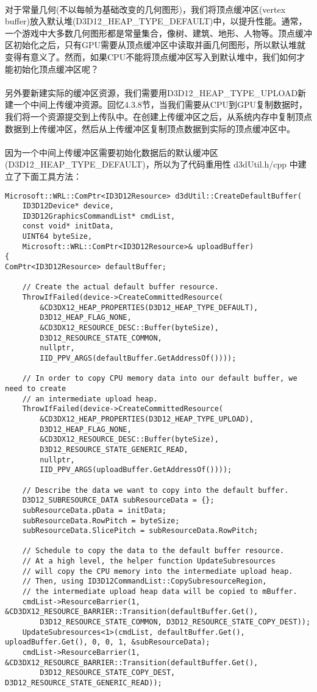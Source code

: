 \begin{flushleft}
~\\
对于常量几何(不以每帧为基础改变的几何图形)，我们将顶点缓冲区(vertex buffer)放入默认堆(D3D12\_HEAP\_TYPE\_DEFAULT)中，以提升性能。通常，一个游戏中大多数几何图形都是常量集合，像树、建筑、地形、人物等。顶点缓冲区初始化之后，只有GPU需要从顶点缓冲区中读取并画几何图形，所以默认堆就变得有意义了。然而，如果CPU不能将顶点缓冲区写入到默认堆中，我们如何才能初始化顶点缓冲区呢？\\
~\\
另外要新建实际的缓冲区资源，我们需要用D3D12\_HEAP\_TYPE\_UPLOAD新建一个中间上传缓冲资源。回忆4.3.8节，当我们需要从CPU到GPU复制数据时，我们将一个资源提交到上传队中。在创建上传缓冲区之后，从系统内存中复制顶点数据到上传缓冲区，然后从上传缓冲区复制顶点数据到实际的顶点缓冲区中。\\
~\\
因为一个中间上传缓冲区需要初始化数据后的默认缓冲区(D3D12\_HEAP\_TYPE\_DEFAULT)，所以为了代码重用性 d3dUtil.h/cpp 中建立了下面工具方法：
\begin{lstlisting}
Microsoft::WRL::ComPtr<ID3D12Resource> d3dUtil::CreateDefaultBuffer(
    ID3D12Device* device,
    ID3D12GraphicsCommandList* cmdList,
    const void* initData,
    UINT64 byteSize,
    Microsoft::WRL::ComPtr<ID3D12Resource>& uploadBuffer)
{
ComPtr<ID3D12Resource> defaultBuffer;

    // Create the actual default buffer resource.
    ThrowIfFailed(device->CreateCommittedResource(
        &CD3DX12_HEAP_PROPERTIES(D3D12_HEAP_TYPE_DEFAULT),
        D3D12_HEAP_FLAG_NONE,
        &CD3DX12_RESOURCE_DESC::Buffer(byteSize),
        D3D12_RESOURCE_STATE_COMMON,
        nullptr,
        IID_PPV_ARGS(defaultBuffer.GetAddressOf())));

    // In order to copy CPU memory data into our default buffer, we need to create
    // an intermediate upload heap. 
    ThrowIfFailed(device->CreateCommittedResource(
        &CD3DX12_HEAP_PROPERTIES(D3D12_HEAP_TYPE_UPLOAD),
        D3D12_HEAP_FLAG_NONE,
        &CD3DX12_RESOURCE_DESC::Buffer(byteSize),
        D3D12_RESOURCE_STATE_GENERIC_READ,
        nullptr,
        IID_PPV_ARGS(uploadBuffer.GetAddressOf())));

    // Describe the data we want to copy into the default buffer.
    D3D12_SUBRESOURCE_DATA subResourceData = {};
    subResourceData.pData = initData;
    subResourceData.RowPitch = byteSize;
    subResourceData.SlicePitch = subResourceData.RowPitch;

    // Schedule to copy the data to the default buffer resource.  
    // At a high level, the helper function UpdateSubresources
    // will copy the CPU memory into the intermediate upload heap.  
    // Then, using ID3D12CommandList::CopySubresourceRegion,
    // the intermediate upload heap data will be copied to mBuffer.
    cmdList->ResourceBarrier(1, &CD3DX12_RESOURCE_BARRIER::Transition(defaultBuffer.Get(), 
        D3D12_RESOURCE_STATE_COMMON, D3D12_RESOURCE_STATE_COPY_DEST));
    UpdateSubresources<1>(cmdList, defaultBuffer.Get(), uploadBuffer.Get(), 0, 0, 1, &subResourceData);
    cmdList->ResourceBarrier(1, &CD3DX12_RESOURCE_BARRIER::Transition(defaultBuffer.Get(),
        D3D12_RESOURCE_STATE_COPY_DEST, D3D12_RESOURCE_STATE_GENERIC_READ));


\end{lstlisting}
\end{flushleft}
